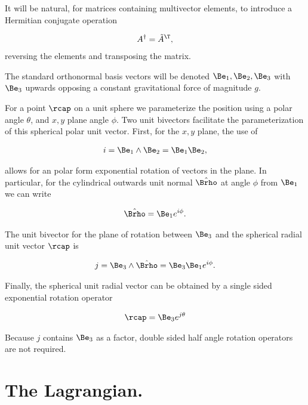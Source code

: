 It will be natural, for matrices containing multivector elements, to introduce a Hermitian conjugate operation

\begin{align}\label{eqn:sPolarArxiv:moo3}
A^\dagger = {\tilde{A}}^\T,
\end{align}
reversing the elements and transposing the matrix.  

The standard orthonormal basis vectors will be denoted $\Be_1, \Be_2, \Be_3$ with $\Be_3$ upwards opposing a constant gravitational force of magnitude $g$.

For a point $\rcap$ on a unit sphere we parameterize the position using a polar angle $\theta$, and $x,y$ plane angle $\phi$.  Two unit bivectors facilitate the parameterization of this spherical polar unit vector.  First, for the $x,y$ plane, the use of

\begin{align}\label{eqn:sPolarArxiv:moo4}
i = \Be_1 \wedge \Be_2 = \Be_1 \Be_2,
\end{align}

allows for an polar form exponential rotation of vectors in the plane.  In particular, for the cylindrical outwards unit normal $\hat{\Brho}$ at angle $\phi$ from $\Be_1$ we can write

\begin{align}\label{eqn:sPolarArxiv:moo5}
\hat{\Brho} = \Be_1 e^{i \phi}.
\end{align}

The unit bivector for the plane of rotation between $\Be_3$ and the spherical radial unit vector $\rcap$ is 

\begin{align}\label{eqn:sPolarArxiv:moo6}
j = \Be_3 \wedge \hat{\Brho} = \Be_3 \Be_1 e^{i \phi}.
\end{align}

Finally, the spherical unit radial vector can be obtained by a single sided exponential rotation operator

\begin{align}\label{eqn:sPolarArxiv:moo7}
\rcap = \Be_3 e^{j \theta}
\end{align}

Because $j$ contains $\Be_3$ as a factor, double sided half angle rotation operators are not required.

\section{The Lagrangian.}

